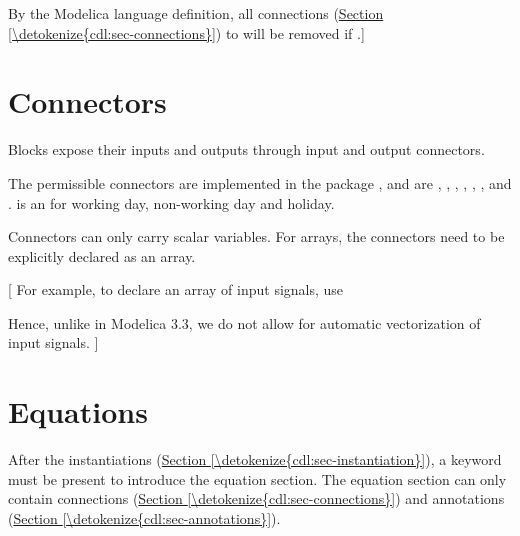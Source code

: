 \documentclass[letterpaper,10pt, openany,english]{sphinxmanual}
\begin{document}
By the Modelica language definition, all connections (\hyperref[\detokenize{cdl:sec-connections}]{Section \ref{\detokenize{cdl:sec-connections}}})
to  will be removed if .{]}


\section{Connectors}
\label{\detokenize{cdl:connectors}}\label{\detokenize{cdl:sec-connectors}}
Blocks expose their inputs and outputs through input and output
connectors.

The permissible connectors are implemented in the package
, and are
, ,
, ,
, ,
 and .
 is an  for working day,
non-working day and holiday.

Connectors can only carry scalar variables.
For arrays, the connectors need to be explicitly declared as an array.

{[} For example, to declare an array of  input signals, use

\begin{sphinxVerbatim}[commandchars=\\\{\}]
   

 \PYG{p}{[}\PYG{p}{]} 
\end{sphinxVerbatim}

Hence, unlike in Modelica 3.3, we do not allow for automatic vectorization
of input signals.
{]}


\section{Equations}
\label{\detokenize{cdl:equations}}\label{\detokenize{cdl:sec-equation}}
After the instantiations (\hyperref[\detokenize{cdl:sec-instantiation}]{Section \ref{\detokenize{cdl:sec-instantiation}}}),
a keyword  must be present
to introduce the equation section.
The equation section can only contain
connections (\hyperref[\detokenize{cdl:sec-connections}]{Section \ref{\detokenize{cdl:sec-connections}}}) and
annotations (\hyperref[\detokenize{cdl:sec-annotations}]{Section \ref{\detokenize{cdl:sec-annotations}}}).
\end{document}
